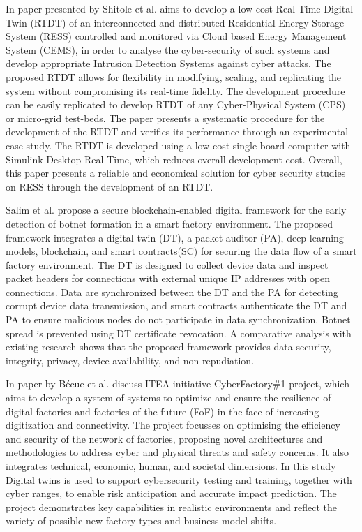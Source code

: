  In\cite{shitoleRealTimeDigitalTwin2021} paper presented by Shitole et al. aims to develop a low-cost Real-Time Digital Twin (RTDT) of an interconnected and distributed Residential Energy Storage System (RESS) controlled and monitored via Cloud based Energy Management System (CEMS), in order to analyse the cyber-security of such systems and develop appropriate Intrusion Detection Systems against cyber attacks. The proposed RTDT allows for flexibility in modifying, scaling, and replicating the system without compromising its real-time fidelity. The development procedure can be easily replicated to develop RTDT of any Cyber-Physical System (CPS) or micro-grid test-beds. The paper presents a systematic procedure for the development of the RTDT and verifies its performance through an experimental case study. The RTDT is developed using a low-cost single board computer with Simulink Desktop Real-Time, which reduces overall development cost. Overall, this paper presents a reliable and economical solution for cyber security studies on RESS through the development of an RTDT.


 Salim et al.\cite{salimBlockchainEnabledSecureDigital2022} propose a secure blockchain-enabled digital framework for the early detection of botnet formation in a smart factory environment. The proposed framework integrates a digital twin (DT), a packet auditor (PA), deep learning models, blockchain, and smart contracts(SC) for securing the data flow of a smart factory environment. The DT is designed to collect device data and inspect packet headers for connections with external unique IP addresses with open connections. Data are synchronized between the DT and the PA for detecting corrupt device data transmission, and smart contracts authenticate the DT and PA to ensure malicious nodes do not participate in data synchronization. Botnet spread is prevented using DT certificate revocation. A comparative analysis with existing research shows that the proposed framework provides data security, integrity, privacy, device availability, and non-repudiation.


In\cite{becueCyberFactorySecuringIndustry40with2018} paper by Bécue et al. discuss ITEA initiative CyberFactory\#1 project, which aims to develop a system of systems to optimize and ensure the resilience of digital factories and factories of the future (FoF) in the face of increasing digitization and connectivity. The project focusses on optimising the efficiency and security of the network of factories, proposing novel architectures and methodologies to address cyber and physical threats and safety concerns. It also integrates technical, economic, human, and societal dimensions. In this study Digital twins is used to support cybersecurity testing and training, together with cyber ranges, to enable risk anticipation and accurate impact prediction. The project demonstrates key capabilities in realistic environments and reflect the variety of possible new factory types and business model shifts.



